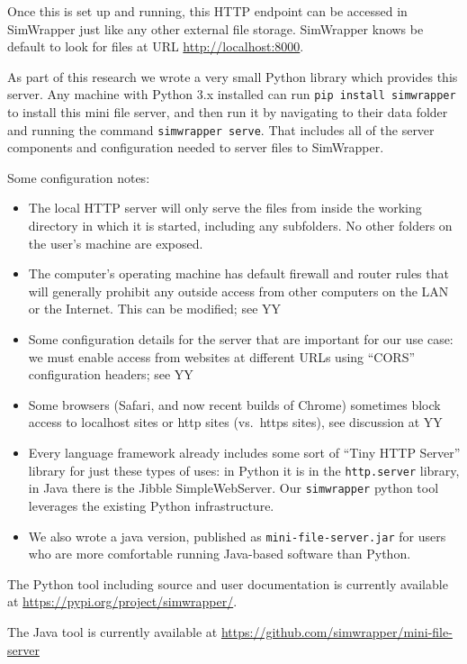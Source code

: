 Once this is set up and running, this HTTP endpoint can be accessed in
SimWrapper just like any other external file storage. SimWrapper knows
be default to look for files at URL \url{http://localhost:8000}.

As part of this research we wrote a very small Python library which
provides this server. Any machine with Python 3.x installed can run
\texttt{pip\ install\ simwrapper} to install this mini file server, and
then run it by navigating to their data folder and running the command
\texttt{simwrapper\ serve}. That includes all of the server components
and configuration needed to server files to SimWrapper.

Some configuration notes:

\begin{itemize}
\item
  The local HTTP server will only serve the files from inside the
  working directory in which it is started, including any subfolders. No
  other folders on the user's machine are exposed.
\item
  The computer's operating machine has default firewall and router rules
  that will generally prohibit any outside access from other computers
  on the LAN or the Internet. This can be modified; see YY
\item
  Some configuration details for the server that are important for our
  use case: we must enable access from websites at different URLs using
  ``CORS'' configuration headers; see YY
\item
  Some browsers (Safari, and now recent builds of Chrome) sometimes
  block access to localhost sites or http sites (vs.~https sites), see
  discussion at YY
\item
  Every language framework already includes some sort of ``Tiny HTTP
  Server'' library for just these types of uses: in Python it is in the
  \texttt{http.server} library, in Java there is the Jibble
  SimpleWebServer. Our \texttt{simwrapper} python tool leverages the
  existing Python infrastructure.
\item
  We also wrote a java version, published as
  \texttt{mini-file-server.jar} for users who are more comfortable
  running Java-based software than Python.
\end{itemize}

The Python tool including source and user documentation is currently
available at \url{https://pypi.org/project/simwrapper/}.

The Java tool is currently available at
\url{https://github.com/simwrapper/mini-file-server}

